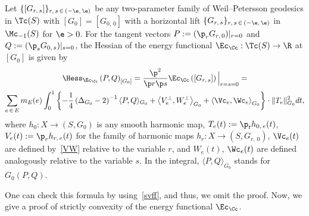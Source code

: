 \begin{theo}\label{Thm:Hessian}
Let $\{[G_{r,\,s}]\}_{r,\,s\,\in\,(-\e,\,\e)}$ be any two-parameter family of Weil--Petersson geodesics in $\Tc(S)$ with $[G_0]=[G_{0,\,0}]$ with a horizontal lift $\{G_{r,\,s}\}_{r,\,s\,\in\,(-\e,\,\e)}$ in $\Mc_{-1}(S)$ for $\e>0$. For the tangent vectors $P:=(\p_r G_{r,\,0})|_{r=0}$ and $Q:=(\p_s G_{0,\,s})|_{s=0}$, the Hessian of the energy functional $\Ec_{\Cc}: \Tc(S)\to \R$ at $[G_0]$ is given by
\begin{multline*}
\Hess_{\Ec_\Cc}\left(P,Q\right)_{[G_0]}=\frac{\p^2}{\p r\p s}\Ec_{\Cc}\left([G_{r,\,s}]\right)\Big|_{r=s=0}=\\
\sum_{e\,\in\,E}m_E(e)\int_0^1\left\{-\frac{1}{4}\left(\Delta_{G_0}-2\right)^{-1}\langle P, Q\rangle_{G_0} +\left\langle V_e^{\perp}, W_e^{\perp}\right\rangle_{G_0}+\left\langle \Vc_e, \Wc_e\right\rangle_{G_0}\right\}\cdot \|T_e\|^2_{G_0}dt,
\end{multline*}
where $h_{0}:X \to (S, G_{0})$ is any smooth harmonic map, $T_e(t):=\p_th_{0,\,e}(t)$, $V_e(t):=\p_r h_{r,\,e}(t)$ for the family of harmonic maps $h_r: X\to (S, G_{r,\,0})$, $\Vc_e(t)$ are defined by~\eqref{VW} relative to the variable $r$, and $W_e(t)$, $\Wc_e(t)$ are defined analogously relative to the variable $s$. In the integral, $\langle P, Q\rangle_{G_0}$ stands for $G_0(P, Q)$.
\end{theo}

One can check this formula by using~\eqref{svff}, and thus, we omit the proof. Now, we give a proof of strictly convexity of the energy functional $\Ec_{\Cc}$.



